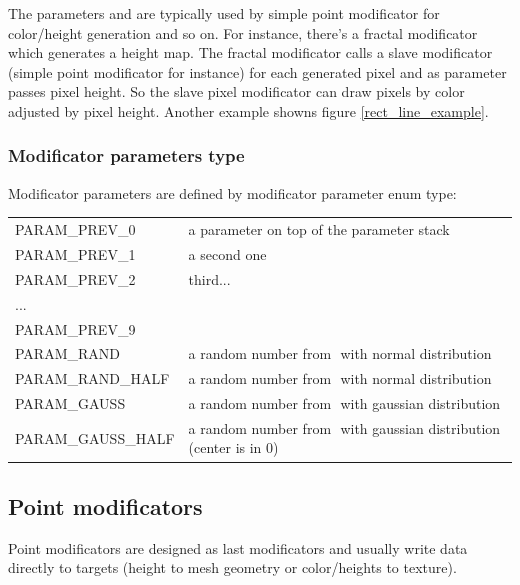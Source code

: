 \documentclass[9pt]{article}
\begin{document}
The parameters and are typically used by simple point modificator 
for color/height generation and so on. For instance, there's a fractal
modificator which generates a height map. The fractal modificator calls
a slave modificator (simple point modificator for instance) for each generated 
pixel and as parameter passes pixel height. So the slave pixel modificator can 
draw pixels by color adjusted by pixel height. Another example showns 
figure \ref{rect_line_example}.

\subsubsection*{Modificator parameters type}

Modificator parameters are defined by modificator parameter enum type:
\begin{center}
\begin{tabular}{|l||p{10cm}|}
\hline
PARAM\_PREV\_0 & a parameter on top of the parameter stack \\
PARAM\_PREV\_1 & a second one \\
PARAM\_PREV\_2 & third... \\
... & \\
PARAM\_PREV\_9 & \\
PARAM\_RAND & a random number from \begin{math}<-1,1>\end{math} with normal distribution \\
PARAM\_RAND\_HALF & a random number from \begin{math}<0,1>\end{math} with normal distribution \\
PARAM\_GAUSS & a random number from \begin{math}<-1,1>\end{math} with gaussian distribution \\
PARAM\_GAUSS\_HALF & a random number from \begin{math}<0,1>\end{math} with gaussian distribution (center is in 0) \\
\hline
\end{tabular}
\end{center}

\subsection{Point modificators}

Point modificators are designed as last modificators and usually write
data directly to targets (height to mesh geometry or color/heights to texture). 
\end{document}
